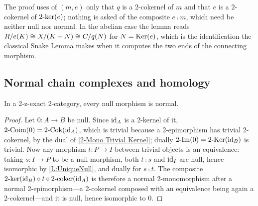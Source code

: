 \begin{remark}
  \label{Rem Dinversion Coker}
  The proof uses of \((m,e)\) only that \(q\) is a 2-cokernel of \(m\) and that \(e\) is a 2-cokernel of \(2\text{-}\mathrm{ker}(e)\); nothing is asked of the composite \(e\comp m\), which need be neither null nor normal. In the abelian case the lemma reads \(R/e(K)\cong X/(K+N)\cong C/q(N)\) for \(N=\mathrm{Ker}(e)\), which is the identification the classical Snake Lemma makes when it computes the two ends of the connecting morphism.
\end{remark}

\subsection{Normal chain complexes and homology}\label{SS:Homology}

\begin{proposition}
  \label{P:NullNormal}   \leanok
  In a 2-z-exact 2-category, every null morphism is normal.
\end{proposition}

\begin{proof}
  \leanok
  Let \(0\colon A\to B\) be null. Since \(\operatorname{id}_{A}\) is a 2-kernel of it, \(2\text{-}\mathrm{Coim}(0)=2\text{-}\mathrm{Cok}(\operatorname{id}_{A})\), which is trivial because a 2-epimorphism has trivial 2-cokernel, by the dual of \lemx\ref{2-Mono Trivial Kernel}; dually \(2\text{-}\mathrm{Im}(0)=2\text{-}\mathrm{Ker}(\operatorname{id}_{B})\) is trivial. Now any morphism \(t\colon P\to I\) between trivial objects is an equivalence: taking \(s\colon I\to P\) to be a null morphism, both \(t\comp s\) and \(\operatorname{id}_{I}\) are null, hence isomorphic by \lemx\ref{L:UniqueNull}, and dually for \(s\comp t\). The composite \(2\text{-}\mathrm{ker}(\operatorname{id}_{B})\circ t\circ2\text{-}\mathrm{coker}(\operatorname{id}_{A})\) is therefore a normal 2-monomorphism after a normal 2-epimorphism---a 2-cokernel composed with an equivalence being again a 2-cokernel---and it is null, hence isomorphic to \(0\).
\end{proof}

